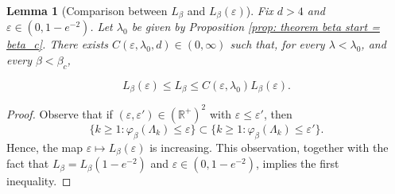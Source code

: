 \documentclass[11pt,a4paper]{article}
\numberwithin{equation}{section}
\theoremstyle{plain}
\newtheorem{Lem}[Thm]{Lemma}
\theoremstyle{definition}
\begin{document}
\begin{Lem}[Comparison between $L_\beta$ and $L_\beta(\varepsilon)$]\label{lem: comparison of diff l} Fix $d>4$ and $\varepsilon\in(0,1-e^{-2})$. Let $\lambda_0$ be given by Proposition \textup{\ref{prop: theorem beta start = beta_c}}. There exists $C(\varepsilon,\lambda_0,d)\in (0,\infty)$ such that, for every $\lambda<\lambda_0$, and every $\beta<\beta_c$,

\begin{equation}
	L_\beta(\varepsilon)\leq L_\beta\leq C(\varepsilon,\lambda_0)L_\beta(\varepsilon).
\end{equation}
\end{Lem}

\begin{proof} Observe that if $(\varepsilon,\varepsilon')\in (\mathbb R^+)^2$ with $\varepsilon\leq \varepsilon'$, then 
\begin{equation}\{k\geq 1: \varphi_\beta(\Lambda_k)\leq \varepsilon\}\subset \{k\geq 1: \varphi_\beta(\Lambda_k)\leq \varepsilon'\}.\end{equation}
 Hence, the map $\varepsilon\mapsto L_\beta(\varepsilon)$ is increasing. This observation, together with the fact that $L_\beta=L_\beta(1-e^{-2})$ and $\varepsilon \in (0,1-e^{-2})$, implies the first inequality. 


\end{proof}
\end{document}
